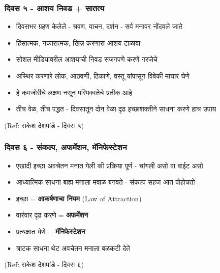 \begin{frame}[fragile]\frametitle{दिवस ५ - आशय निवड + सातत्य}

	\begin{itemize}
	\item दिवसभर ग्रहण केलेले - श्रवण, वाचन, दर्शन - सर्व मनावर नोंदवले जाते
	\item हिंसात्मक, नकारात्मक, खिन्न करणारा आशय टाळावा
	\item सोशल मीडियावरील आशयाची निवड सजगपणे करणे गरजेचे
	\item अस्थिर करणारे लोक, आठवणी, ठिकाणे, वस्तू यांपासून विवेकी माघार घेणे
	\item हे कमजोरीचे लक्षण नसून परिपक्वतेचे प्रतीक आहे
	\item तीच वेळ, तीच पद्धत - दिवसातून दोन वेळा दृढ इच्छाशक्तीने साधना करणे हाच उपाय
	\end{itemize}

{\tiny (Ref: राकेश देशपांडे - दिवस ५)}

\end{frame}


\begin{frame}[fragile]\frametitle{दिवस ६ - संकल्प, अफर्मेशन, मॅनिफेस्टेशन}

	\begin{itemize}
	\item एखादी इच्छा अवचेतन मनात गेली की प्रक्रिया पूर्ण - चांगली असो वा वाईट असो
	\item आध्यात्मिक साधना बाह्य मनाला मवाळ बनवते - संकल्प सहज आत पोहोचतो
	\item इच्छा = \textbf{आकर्षणाचा नियम} (Law of Attraction)
	\item वारंवार दृढ करणे = \textbf{अफर्मेशन}
	\item प्रत्यक्षात येणे = \textbf{मॅनिफेस्टेशन}
	\item त्राटक साधना थेट अवचेतन मनाला बळकटी देते
	\end{itemize}

{\tiny (Ref: राकेश देशपांडे - दिवस ६)}

\end{frame}

